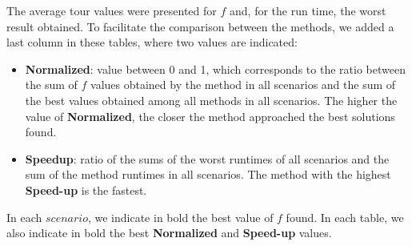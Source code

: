 \documentclass[preprint,authoryear]{elsarticle}
\begin{document}
The average tour values were presented for $f$ and, for the run time, the worst result obtained. To facilitate the comparison between the methods, we added a last column in these tables, where two values are indicated:
\begin{itemize}
	\item {\bf Normalized}: value between 0 and 1, which corresponds to the ratio between the sum of $f$\/ values obtained by the method in all scenarios and the sum of the best values obtained among all methods in all scenarios. The higher the value of {\bf Normalized}, the closer the method approached the best solutions found.
	\item {\bf Speedup}: ratio of the sums of the worst runtimes of all scenarios and the sum of the method runtimes in all scenarios. The method with the highest {\bf Speed-up}\/ is the fastest.
\end{itemize}

In each $scenario$, we indicate in bold the best value of $f$\/ found. In each table, we also indicate in bold the best {\bf Normalized}\/ and {\bf Speed-up}\/ values.

\vspace{2.0mm}
\end{document}
